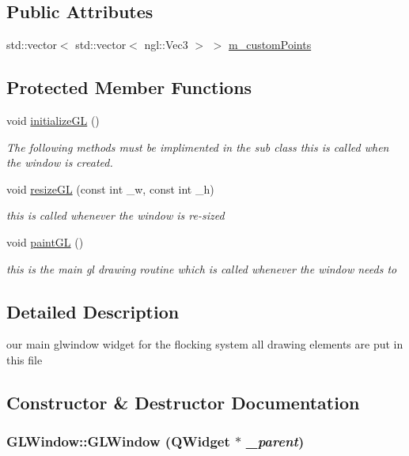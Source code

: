 \subsection*{Public Attributes}
\begin{DoxyCompactItemize}
\item 
std::vector$<$ std::vector$<$ ngl::Vec3 $>$ $>$ \hyperlink{classGLWindow_ab33c3b96320802b33660ebcc16ca302d}{m\_\-customPoints}
\end{DoxyCompactItemize}
\subsection*{Protected Member Functions}
\begin{DoxyCompactItemize}
\item 
void \hyperlink{classGLWindow_a39e39761cd7323806917a217cc7caea5}{initializeGL} ()
\begin{DoxyCompactList}\small\item\em The following methods must be implimented in the sub class this is called when the window is created. \item\end{DoxyCompactList}\item 
void \hyperlink{classGLWindow_abe57c0f40e59cba4c98759121e22eb47}{resizeGL} (const int \_\-w, const int \_\-h)
\begin{DoxyCompactList}\small\item\em this is called whenever the window is re-\/sized \item\end{DoxyCompactList}\item 
void \hyperlink{classGLWindow_a9bd2503dd5f812c10a9481f22ecd3403}{paintGL} ()
\begin{DoxyCompactList}\small\item\em this is the main gl drawing routine which is called whenever the window needs to \item\end{DoxyCompactList}\end{DoxyCompactItemize}


\subsection{Detailed Description}
our main glwindow widget for the flocking system all drawing elements are put in this file 

\subsection{Constructor \& Destructor Documentation}
\hypertarget{classGLWindow_a8dfc33113be0a86a53ddbea054f75292}{
\subsubsection[{GLWindow}]{\setlength{\rightskip}{0pt plus 5cm}GLWindow::GLWindow (QWidget $\ast$ {\em \_\-parent})}}
\label{classGLWindow_a8dfc33113be0a86a53ddbea054f75292}


